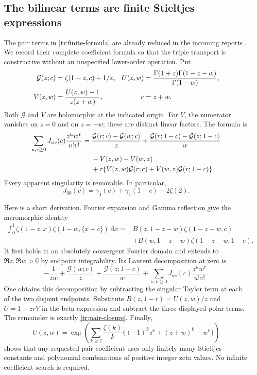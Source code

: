 \documentclass[11pt,a4paper]{article}
\numberwithin{equation}{section}
\theoremstyle{definition}
\theoremstyle{remark}
\newcommand{\dd}{\,\mathrm d}
\begin{document}
\subsection{The bilinear terms are finite Stieltjes expressions}
The pair terms in \eqref{tr:finite-formula} are already reduced in the
incoming reports \cite{incoming-sh,incoming-md}. We record their complete
coefficient formula so that the triple transport is constructive without
an unspecified lower-order operation. Put
\begin{align}
 \mathcal G(z;c)&=\zeta(1-z,c)+1/z,
 & U(z,w)&=\frac{\Gamma(1+z)\Gamma(1-z-w)}{\Gamma(1-w)},\notag\\
 V(z,w)&=\frac{U(z,w)-1}{z(z+w)},
 &r&=z+w.\label{tr:pair-generators}
\end{align}
Both $\mathcal G$ and $V$ are holomorphic at the indicated origin. For
$V$, the numerator vanishes on $z=0$ and on $z=-w$; these are distinct
linear factors. The formula is
\begin{align}
 \sum_{u,v\geq0}J_{uv}(c)\frac{z^uw^v}{u!v!}
 ={}&\frac{\mathcal G(r;c)-\mathcal G(w;c)}z
     +\frac{\mathcal G(r;1-c)-\mathcal G(z;1-c)}w\notag\\
 &-V(z,w)-V(w,z)\notag\\
 &+r\{V(z,w)\mathcal G(r;c)
           +V(w,z)\mathcal G(r;1-c)\}.\label{tr:pair-closure}
\end{align}
Every apparent singularity is removable. In particular,
\begin{equation}\label{tr:J00}
 J_{00}(c)=\gamma_1(c)+\gamma_1(1-c)-2\zeta(2).
\end{equation}

Here is a short derivation. Fourier expansion and Gamma reflection give
the meromorphic identity
\begin{align*}
 \int_0^1\zeta(1-z,x)\zeta(1-w,\{x+c\})\dd x
 ={}&B(z,1-z-w)\zeta(1-z-w,c)\\
 &+B(w,1-z-w)\zeta(1-z-w,1-c).
\end{align*}
It first holds in an absolutely convergent Fourier domain and extends
to $\Re z,\Re w>0$ by endpoint integrability. Its Laurent decomposition
at zero is
\[
 -\frac1{zw}+\frac{\mathcal G(w;c)}z
      +\frac{\mathcal G(z;1-c)}w
      +\sum_{u,v\geq0}J_{uv}(c)\frac{z^uw^v}{u!v!}.
\]
One obtains this decomposition by subtracting the singular Taylor term
at each of the two disjoint endpoints. Substitute
$B(z,1-r)=U(z,w)/z$ and $U=1+zrV$ in the beta expression and subtract
the three displayed polar terms. The remainder is exactly
\eqref{tr:pair-closure}.
Finally,
\[
 U(z,w)=\exp\!\left(\sum_{k\geq2}\frac{\zeta(k)}k
             \{(-1)^kz^k+(z+w)^k-w^k\}\right)
\]
shows that any requested pair coefficient uses only finitely many
Stieltjes constants and polynomial combinations of positive integer
zeta values. No infinite coefficient search is required.
\end{document}

